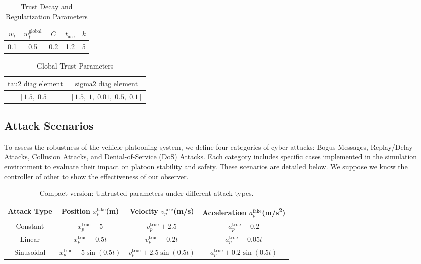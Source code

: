\documentclass[letterpaper, 10pt, conference]{ieeeconf}  %
\begin{document}
\begin{table}[h!]
\centering
\caption{Trust Decay and Regularization Parameters}
\begin{tabular}{|c|c|c|c|c|}
\hline
$w_t$ & $w_t^{\text{global}}$ & $C$ & $t_{\text{acc}}$ & $k$ \\
\hline
0.1 & 0.5 & 0.2 & 1.2 & 5 \\
\hline
\end{tabular}
\end{table}

\begin{table}[h!]
\centering
\caption{Global Trust Parameters}
\begin{tabular}{|c|c|}
\hline
$\text{tau2\_diag\_element}$ & $\text{sigma2\_diag\_element}$ \\
\hline
$[1.5,\; 0.5]$ & $[1.5,\; 1,\; 0.01,\; 0.5,\; 0.1]$ \\
\hline
\end{tabular}
\end{table}


\subsection{Attack Scenarios}
\label{sec:attack_scenarios}

To assess the robustness of the vehicle platooning system, we define four categories of cyber-attacks: Bogus Messages, Replay/Delay Attacks, Collusion Attacks, and Denial-of-Service (DoS) Attacks. Each category includes specific cases implemented in the simulation environment to evaluate their impact on platoon stability and safety. These scenarios are detailed below.
We suppose we know the controller of other to show the effectiveness of our observer.


\begin{table}[h!]
\centering
\renewcommand{\arraystretch}{1.2}
\begin{tabular}{|c|c|c|c|}
\hline
\textbf{Attack Type} & 
\shortstack{Position\\$x_p^{\text{fake}}$(m)} & 
\shortstack{Velocity\\$v_p^{\text{fake}}$(m/s)} & 
\shortstack{Acceleration\\$a_p^{\text{fake}}$(m/s\textsuperscript{2})} \\
\hline
Constant & $x_p^{\text{true}} \pm 5$ & $v_p^{\text{true}} \pm 2.5$ & $a_p^{\text{true}} \pm 0.2$ \\
\hline
Linear & $x_p^{\text{true}} \pm 0.5t$ & $v_p^{\text{true}} \pm 0.2t$ & $a_p^{\text{true}} \pm 0.05t$ \\
\hline
Sinusoidal & $x_p^{\text{true}} \pm 5\sin(0.5t)$ & $v_p^{\text{true}} \pm 2.5\sin(0.5t)$ & $a_p^{\text{true}} \pm 0.2\sin(0.5t)$ \\
\hline
\end{tabular}
\caption{Compact version: Untrusted parameters under different attack types.}
\end{table}
\end{document}
